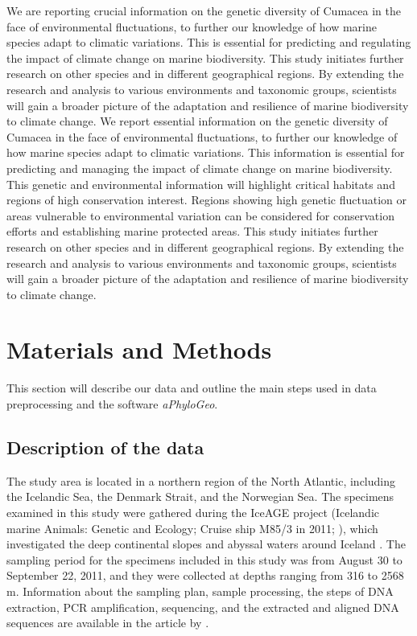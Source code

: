 We are reporting crucial information on the genetic diversity of Cumacea in the face of environmental fluctuations, to further our knowledge of how marine species adapt to climatic variations. This is essential for predicting and regulating the impact of climate change on marine biodiversity. This study initiates further research on other species and in different geographical regions. By extending the research and analysis to various environments and taxonomic groups, scientists will gain a broader picture of the adaptation and resilience of marine biodiversity to climate change. We report essential information on the genetic diversity of Cumacea in the face of environmental fluctuations, to further our knowledge of how marine species adapt to climatic variations. This information is essential for predicting and managing the impact of climate change on marine biodiversity. This genetic and environmental information will highlight critical habitats and regions of high conservation interest. Regions showing high genetic fluctuation or areas vulnerable to environmental variation can be considered for conservation efforts and establishing marine protected areas. This study initiates further research on other species and in different geographical regions. By extending the research and analysis to various environments and taxonomic groups, scientists will gain a broader picture of the adaptation and resilience of marine biodiversity to climate change.

\section{Materials and Methods}\label{materials-methods}
This section will describe our data and outline the main steps used in data preprocessing and the software \textit{aPhyloGeo}. 

\subsection{Description of the data}
The study area is located in a northern region of the North Atlantic, including the Icelandic Sea, the Denmark Strait, and the Norwegian Sea. The specimens examined in this study were gathered during the IceAGE project (Icelandic marine Animals: Genetic and Ecology; Cruise ship M85/3 in 2011; \cite{brix_iceage_2014}), which investigated the deep continental slopes and abyssal waters around Iceland \citep{meisner_prefacebiodiversity_2018}. The sampling period for the specimens included in this study was from August 30 to September 22, 2011, and they were collected at depths ranging from 316 to 2568 m.  Information about the sampling plan, sample processing, the steps of DNA extraction, PCR amplification, sequencing, and the extracted and aligned DNA sequences are available in the article by \citep{uhlir_adding_2021}.

